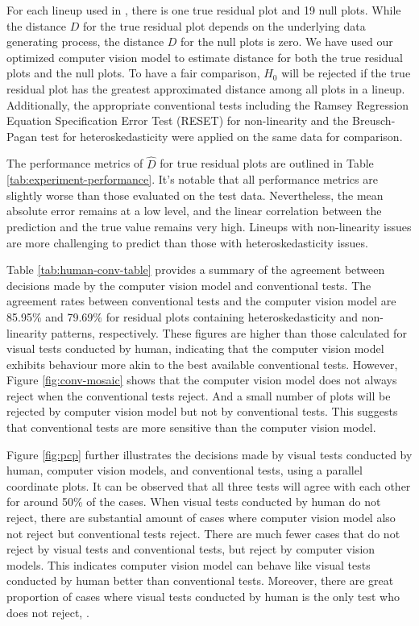 \documentclass[]{interact}
\theoremstyle{plain}%
\theoremstyle{definition}
\theoremstyle{remark}
\begin{document}
For each lineup used in \citet{li2023plot}, there is one true residual
plot and 19 null plots. While the distance \(D\) for the true residual
plot depends on the underlying data generating process, the distance
\(D\) for the null plots is zero. We have used our optimized computer
vision model to estimate distance for both the true residual plots and
the null plots. To have a fair comparison, \(H_0\) will be rejected if
the true residual plot has the greatest approximated distance among all
plots in a lineup. Additionally, the appropriate conventional tests
including the Ramsey Regression Equation Specification Error Test
(RESET) \citep{ramsey1969tests} for non-linearity and the Breusch-Pagan
test \citep{breusch1979simple} for heteroskedasticity were applied on
the same data for comparison.

The performance metrics of \(\hat{D}\) for true residual plots are
outlined in Table \ref{tab:experiment-performance}. It's notable that
all performance metrics are slightly worse than those evaluated on the
test data. Nevertheless, the mean absolute error remains at a low level,
and the linear correlation between the prediction and the true value
remains very high. Lineups with non-linearity issues are more
challenging to predict than those with heteroskedasticity issues.

Table \ref{tab:human-conv-table} provides a summary of the agreement
between decisions made by the computer vision model and conventional
tests. The agreement rates between conventional tests and the computer
vision model are 85.95\% and 79.69\% for residual plots containing
heteroskedasticity and non-linearity patterns, respectively. These
figures are higher than those calculated for visual tests conducted by
human, indicating that the computer vision model exhibits behaviour more
akin to the best available conventional tests. However, Figure
\ref{fig:conv-mosaic} shows that the computer vision model does not
always reject when the conventional tests reject. And a small number of
plots will be rejected by computer vision model but not by conventional
tests. This suggests that conventional tests are more sensitive than the
computer vision model.

Figure \ref{fig:pcp} further illustrates the decisions made by visual
tests conducted by human, computer vision models, and conventional
tests, using a parallel coordinate plots. It can be observed that all
three tests will agree with each other for around 50\% of the cases.
When visual tests conducted by human do not reject, there are
substantial amount of cases where computer vision model also not reject
but conventional tests reject. There are much fewer cases that do not
reject by visual tests and conventional tests, but reject by computer
vision models. This indicates computer vision model can behave like
visual tests conducted by human better than conventional tests.
Moreover, there are great proportion of cases where visual tests
conducted by human is the only test who does not reject, .
\end{document}
